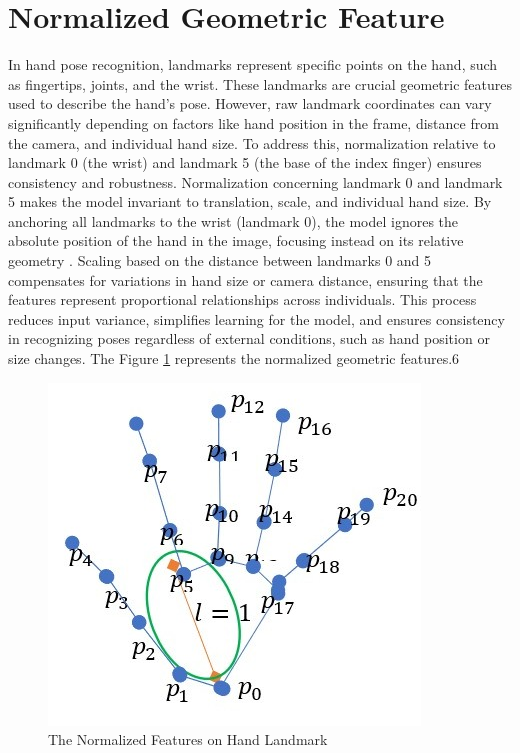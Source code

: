 \section{Normalized Geometric Feature}
In hand pose recognition, landmarks represent specific points on the hand, such as fingertips, joints, and the wrist. These landmarks are crucial geometric features used to describe the hand's pose. However, raw landmark coordinates can vary significantly depending on factors like hand position in the frame, distance from the camera, and individual hand size. To address this, normalization relative to landmark 0 (the wrist) and landmark 5 (the base of the index finger) ensures consistency and robustness. Normalization concerning landmark 0 and landmark 5 makes the model invariant to translation, scale, and individual hand size. By anchoring all landmarks to the wrist (landmark 0), the model ignores the absolute position of the hand in the image, focusing instead on its relative geometry \cite{10731943}. Scaling based on the distance between landmarks 0 and 5 compensates for variations in hand size or camera distance, ensuring that the features represent proportional relationships across individuals. This process reduces input variance, simplifies learning for the model, and ensures consistency in recognizing poses regardless of external conditions, such as hand position or size changes. The Figure \ref{fig:hand_feature_norm} represents the normalized geometric features.6
\begin{figure}[h]
	\centering
	\includegraphics[width=0.7\linewidth]{img/hand_feature_normalized} 
	\caption{The Normalized Features on Hand Landmark}
	\label{fig:hand_feature_norm} %
\end{figure}

